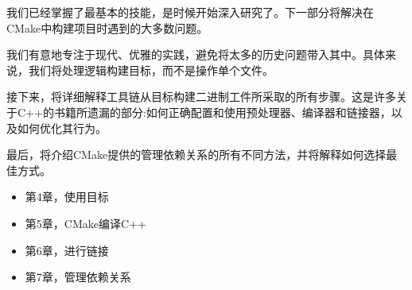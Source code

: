 我们已经掌握了最基本的技能，是时候开始深入研究了。下一部分将解决在CMake中构建项目时遇到的大多数问题。

我们有意地专注于现代、优雅的实践，避免将太多的历史问题带入其中。具体来说，我们将处理逻辑构建目标，而不是操作单个文件。

接下来，将详细解释工具链从目标构建二进制工件所采取的所有步骤。这是许多关于C++的书籍所遗漏的部分:如何正确配置和使用预处理器、编译器和链接器，以及如何优化其行为。

最后，将介绍CMake提供的管理依赖关系的所有不同方法，并将解释如何选择最佳方式。

\begin{itemize}
\item 第4章，使用目标
\item 第5章，CMake编译C++
\item 第6章，进行链接
\item 第7章，管理依赖关系
\end{itemize}